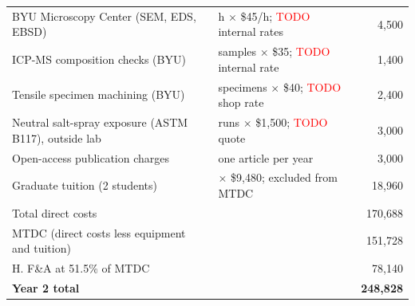 \begin{longtable}{@{}>{\raggedright\arraybackslash}p{2.6in}>{\raggedright\arraybackslash}p{2.75in}r@{}}
BYU Microscopy Center (SEM, EDS, EBSD) & 100 h $\times$ \$45/h; \textcolor{red}{TODO} internal rates & 4,500 \\
ICP-MS composition checks (BYU) & 40 samples $\times$ \$35; \textcolor{red}{TODO} internal rate & 1,400 \\
Tensile specimen machining (BYU) & 60 specimens $\times$ \$40; \textcolor{red}{TODO} shop rate & 2,400 \\
Neutral salt-spray exposure (ASTM B117), outside lab & 2 runs $\times$ \$1,500; \textcolor{red}{TODO} quote & 3,000 \\
Open-access publication charges & one article per year & 3,000 \\
Graduate tuition (2 students) & 2 $\times$ \$9,480; excluded from MTDC & 18,960 \\
\midrule
Total direct costs & & 170,688 \\
MTDC (direct costs less equipment and tuition) & & 151,728 \\
H. F\&A at 51.5\% of MTDC & & 78,140 \\
\textbf{Year 2 total} & & \textbf{248,828} \\
\bottomrule
\end{longtable}
